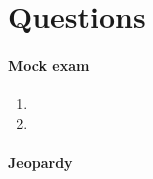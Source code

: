 \documentclass[main]{subfiles}
\begin{document}
\newpage
\appendix
\section{Questions}

\paragraph{Mock exam}
\begin{enumerate}
    \item 
    \item 
\end{enumerate}


\paragraph{Jeopardy}
\end{document}
